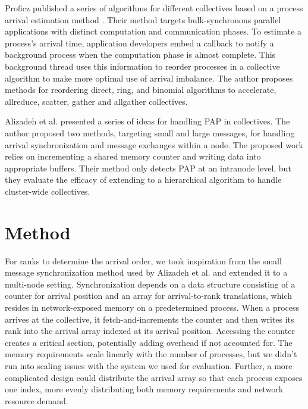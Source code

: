 Proficz published a series of algorithms for different collectives based on a process arrival estimation method \cite{Proficz2018ImprvAllReduceForImbPAP, Proficz2020PAPAwareScatterGather, Proficz2021AllGatherResilientToImbPAP}.
Their method targets bulk-synchronous parallel applications with distinct computation and communication phases.
To estimate a process's arrival time, application developers embed a callback to notify a background process when the computation phase is almost complete.
This background thread uses this information to reorder processes in a collective algorithm to make more optimal use of arrival imbalance.
The author proposes methods for reordering direct, ring, and binomial algorithms to accelerate, allreduce, scatter, gather and allgather collectives.

Alizadeh et al. \cite{Alizadeh2022PAPCollDL} presented a series of ideas for handling PAP in collectives. 
The author proposed two methods, targeting small and large messages, for handling arrival synchronization and message exchanges within a node.
The proposed work relies on incrementing a shared memory counter and writing data into appropriate buffers.
Their method only detects PAP at an intranode level, but they evaluate the efficacy of extending to a hierarchical algorithm to handle cluster-wide collectives.

\section{Method}
For ranks to determine the arrival order, we took inspiration from the small message synchronization method used by Alizadeh et al. \cite{Alizadeh2022PAPCollDL} and extended it to a multi-node setting.
Synchronization depends on a data structure consisting of a counter for arrival position and an array for arrival-to-rank translations, which resides in network-exposed memory on a predetermined process.
When a process arrives at the collective, it fetch-and-increments the counter and then writes its rank into the arrival array indexed at its arrival position.
Accessing the counter creates a critical section, potentially adding overhead if not accounted for.
The memory requirements scale linearly with the number of processes, but we didn't run into scaling issues with the system we used for evaluation.
Further, a more complicated design could distribute the arrival array so that each process exposes one index, more evenly distributing both memory requirements and network resource demand.

